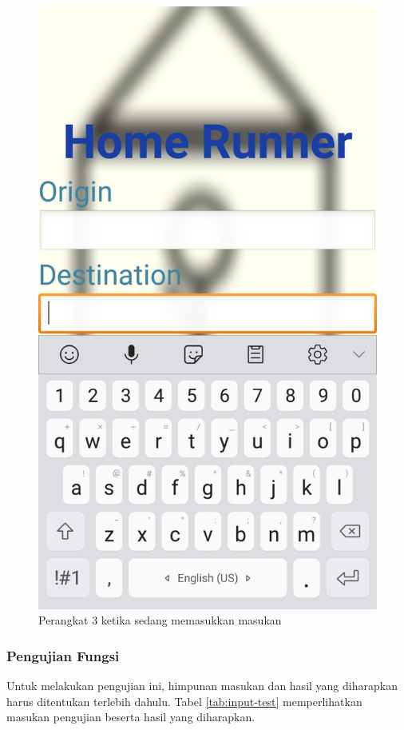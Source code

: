 \begin{figure}[!htb]
  \includegraphics[width=\linewidth]{Gambar/samsung-j7-screenshot.png}
  \caption{Perangkat 3 ketika sedang memasukkan masukan}\label{fig:j7-screenshot}
\endminipage
\end{figure} 

\subsubsection{Pengujian Fungsi}
Untuk melakukan pengujian ini, himpunan masukan dan hasil yang diharapkan harus ditentukan terlebih dahulu. Tabel \ref{tab:input-test} memperlihatkan masukan pengujian beserta hasil yang diharapkan. 

